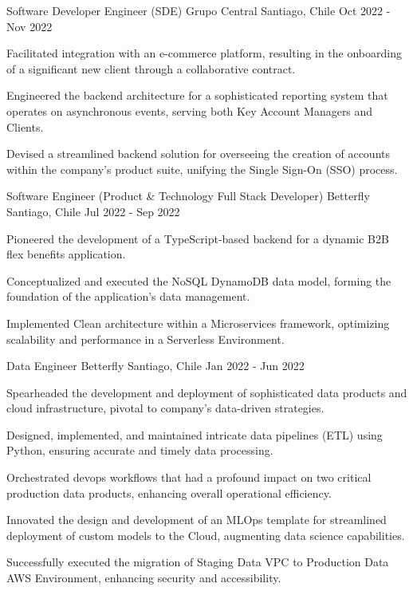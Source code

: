   \newline
  \cventry
  {Software Developer Engineer (SDE)}
  {Grupo Central}
  {Santiago, Chile}
  {Oct 2022 - Nov 2022}
  {
    \begin{cvitems}
      \item {Facilitated integration with an e-commerce platform, resulting in the onboarding of a significant new client through a collaborative contract.}
      \item {Engineered the backend architecture for a sophisticated reporting system that operates on asynchronous events, serving both Key Account Managers and Clients.}
      \item {Devised a streamlined backend solution for overseeing the creation of accounts within the company's product suite, unifying the Single Sign-On (SSO) process.}
    \end{cvitems}
  }
  \newline
  \cventry
  {Software Engineer (Product \& Technology Full Stack Developer)}
  {Betterfly}
  {Santiago, Chile}
  {Jul 2022 - Sep 2022}
  {
  \begin{cvitems} %
    \item Pioneered the development of a TypeScript-based backend for a dynamic B2B flex benefits application.
    \item Conceptualized and executed the NoSQL DynamoDB data model, forming the foundation of the application's data management.
    \item Implemented Clean architecture within a Microservices framework, optimizing scalability and performance in a Serverless Environment.
  \end{cvitems}
  }
  \newline
  \cventry
  {Data Engineer}
  {Betterfly}
  {Santiago, Chile}
  {Jan 2022 - Jun 2022}
  {
  \begin{cvitems} %
    \item Spearheaded the development and deployment of sophisticated data products and cloud infrastructure, pivotal to company's data-driven strategies.
    \item Designed, implemented, and maintained intricate data pipelines (ETL) using Python, ensuring accurate and timely data processing.
    \item Orchestrated devops workflows that had a profound impact on two critical production data products, enhancing overall operational efficiency.
    \item Innovated the design and development of an MLOps template for streamlined deployment of custom models to the Cloud, augmenting data science capabilities.
    \item Successfully executed the migration of Staging Data VPC to Production Data AWS Environment, enhancing security and accessibility.
  \end{cvitems}
  }
  \newline
